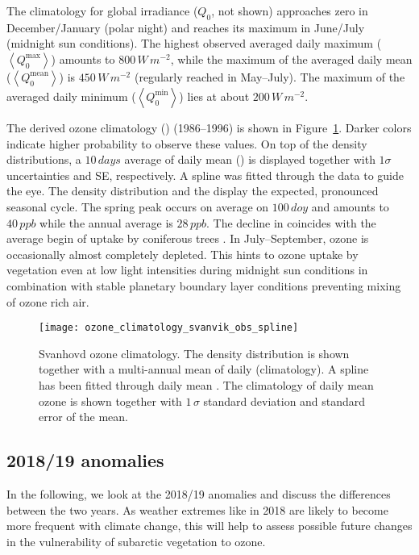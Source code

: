 \documentclass[bg, manuscript]{copernicus}
\begin{document}
The climatology for global irradiance ($Q_0$, not shown) approaches zero in December/January (polar night) and reaches its maximum in June/July (midnight sun conditions). The highest observed averaged daily maximum ($\left<Q_0^\mathrm{max}\right>$) amounts to $800\,\unit{W\,m^{-2}}$, while the maximum of the averaged daily mean ($\left<Q_0^\mathrm{mean}\right>$) is $450\,\unit{W\,m^{-2}}$ (regularly reached in May--July). The maximum of the averaged daily minimum ($\left<Q_0^\mathrm{min}\right>$) lies at about $200\,\unit{W\,m^{-2}}$.

The derived ozone climatology (\chem{\left<[O_3]\right>}) (1986--1996) is shown in Figure~\ref{fig:ozone_climatology_fenoscandic_obs_spline}. Darker colors indicate higher probability to observe these values. On top of the density distributions, a $10\,\unit{days}$ average of daily mean () is displayed together with $1 \sigma$ uncertainties and SE, respectively. A spline was fitted through the data to guide the eye. The \chem{[O_3]} density distribution and the  display the expected, pronounced seasonal cycle. The spring peak occurs on average on $100\,\unit{doy}$ and amounts to $40\,\unit{ppb}$ while the annual average \chem{\left<[O_3]\right>} is $28\,\unit{ppb}$. The decline in \chem{\left<[O_3]\right>} coincides with the average begin of  uptake by coniferous trees \citep{TB:Kolari2007, TP:Wallin2013}. In July--September, ozone is occasionally almost completely depleted. This hints to ozone uptake by vegetation even at low light intensities during midnight sun conditions in combination with stable planetary boundary layer conditions preventing mixing of ozone rich air.

\begin{figure}[t]
  \texttt{[image: ozone\_climatology\_svanvik\_obs\_spline]}
  \caption{Svanhovd ozone climatology. The density distribution is shown together with a multi-annual mean of daily \chem{[O_3]} (climatology). A spline has been fitted through daily mean \chem{[O_3]}. The climatology of daily mean ozone is shown together with $1\,\sigma$ standard deviation and standard error of the mean.}
  \label{fig:ozone_climatology_fenoscandic_obs_spline}
\end{figure}

\subsection{2018/19 anomalies}
\label{subsec:anomalies}
In the following, we look at the 2018/19 anomalies and discuss the differences between the two years. As weather extremes like in 2018 are likely to become more frequent with climate change, this will help to assess possible future changes in the vulnerability of subarctic vegetation to ozone.\\ 
\end{document}
